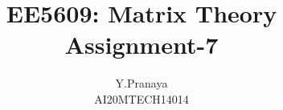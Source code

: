 \documentclass[journal,12pt,twocolumn]{IEEEtran}
\begin{document}
\makeatother
\let\StandardTheFigure\thefigure
\let\vec\mathbf
\renewcommand{\thefigure}{\theproblem}
\def\putbox#1#2#3{\makebox[0in][l]{\makebox[#1][l]{}\raisebox{\baselineskip}[0in][0in]{\raisebox{#2}[0in][0in]{#3}}}}
     \def\rightbox#1{\makebox[0in][r]{#1}}
     \def\centbox#1{\makebox[0in]{#1}}
     \def\topbox#1{\raisebox{-\baselineskip}[0in][0in]{#1}}
     \def\midbox#1{\raisebox{-0.5\baselineskip}[0in][0in]{#1}}
\vspace{3cm}
\title{EE5609: Matrix Theory\\
          Assignment-7\\}
\author{Y.Pranaya\\
AI20MTECH14014 }
%
%
%
% 
%
\end{document}
